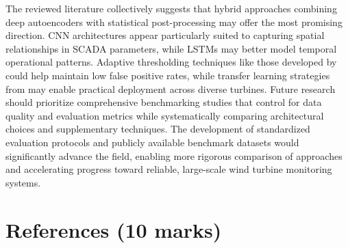 \documentclass[a4paper,12pt]{article}
\begin{document}
The reviewed literature collectively suggests that hybrid approaches combining deep autoencoders with statistical post-processing may offer the most promising direction. CNN architectures appear particularly suited to capturing spatial relationships in SCADA parameters, while LSTMs may better model temporal operational patterns. Adaptive thresholding techniques like those developed by \citeauthor{zhao_anomaly_2018} could help maintain low false positive rates, while transfer learning strategies from \citeauthor{roelofs_transfer_2024} may enable practical deployment across diverse turbines. Future research should prioritize comprehensive benchmarking studies that control for data quality and evaluation metrics while systematically comparing architectural choices and supplementary techniques. The development of standardized evaluation protocols and publicly available benchmark datasets would significantly advance the field, enabling more rigorous comparison of approaches and accelerating progress toward reliable, large-scale wind turbine monitoring systems.


\section{References (10 marks)}



\end{document}
